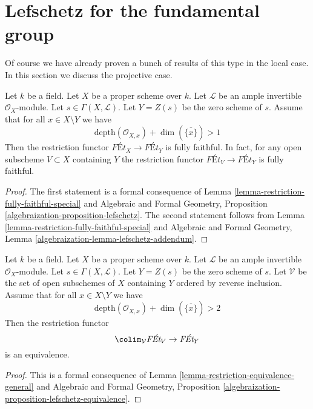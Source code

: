 \section{Lefschetz for the fundamental group}
\label{section-global-lefschetz}

\noindent
Of course we have already proven a bunch of results of this type
in the local case. In this section we discuss the projective case.

\begin{proposition}
\label{proposition-lefschetz-fully-faithful}
Let $k$ be a field. Let $X$ be a proper scheme over $k$.
Let $\mathcal{L}$ be an ample invertible $\mathcal{O}_X$-module.
Let $s \in \Gamma(X, \mathcal{L})$. Let $Y = Z(s)$ be the
zero scheme of $s$. Assume that for all $x \in X \setminus Y$
we have
$$
\text{depth}(\mathcal{O}_{X, x}) + \dim(\overline{\{x\}}) > 1
$$
Then the restriction functor $\textit{F\'Et}_X \to \textit{F\'Et}_Y$
is fully faithful. In fact, for any open subscheme $V \subset X$
containing $Y$ the restriction functor
$\textit{F\'Et}_V \to \textit{F\'Et}_Y$
is fully faithful. 
\end{proposition}

\begin{proof}
The first statement is a formal consequence of
Lemma \ref{lemma-restriction-fully-faithful-special}
and
Algebraic and Formal Geometry, Proposition
\ref{algebraization-proposition-lefschetz}.
The second statement follows from
Lemma \ref{lemma-restriction-fully-faithful-special}
and
Algebraic and Formal Geometry, Lemma
\ref{algebraization-lemma-lefschetz-addendum}.
\end{proof}

\begin{proposition}
\label{proposition-lefschetz-equivalence-general}
Let $k$ be a field. Let $X$ be a proper scheme over $k$.
Let $\mathcal{L}$ be an ample invertible $\mathcal{O}_X$-module.
Let $s \in \Gamma(X, \mathcal{L})$. Let $Y = Z(s)$ be the
zero scheme of $s$. Let $\mathcal{V}$ be the set of open
subschemes of $X$ containing $Y$ ordered by reverse inclusion.
Assume that for all $x \in X \setminus Y$ we have
$$
\text{depth}(\mathcal{O}_{X, x}) + \dim(\overline{\{x\}}) > 2
$$
Then the restriction functor
$$
\colim_\mathcal{V} \textit{F\'Et}_V \to \textit{F\'Et}_Y
$$
is an equivalence.
\end{proposition}

\begin{proof}
This is a formal consequence of
Lemma \ref{lemma-restriction-equivalence-general} and
Algebraic and Formal Geometry, Proposition
\ref{algebraization-proposition-lefschetz-equivalence}.
\end{proof}

